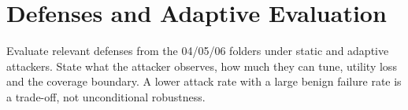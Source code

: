 \section{Defenses and Adaptive Evaluation}
Evaluate relevant defenses from the 04/05/06 folders under static and adaptive attackers. State what the attacker
observes, how much they can tune, utility loss and the coverage boundary. A lower attack rate with a large benign
failure rate is a trade-off, not unconditional robustness.
